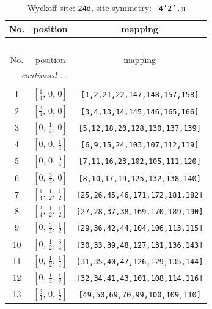 \documentclass[fleqn,8pt]{jsarticle}
\begin{document}
\begin{longtable}{ccc}
\caption{Wyckoff site: {\tt 24d}, site symmetry: {\tt -4'2'.m}}
 \\
 \hline \hline
No. & position & mapping \\ \hline \endfirsthead

\multicolumn{2}{l}{\tablename\ \thetable{}} \\
 \hline \hline
No. & position & mapping \\ \hline \endhead

 \hline \hline
\multicolumn{2}{r}{\footnotesize\it continued ...} \\ \endfoot

 \hline \hline
\multicolumn{2}{r}{} \\ \endlastfoot

1 & $\left[ \frac{1}{4},\, 0,\, 0 \right]$ & {\tt [1,2,21,22,147,148,157,158]} \\ \hline
2 & $\left[ \frac{3}{4},\, 0,\, 0 \right]$ & {\tt [3,4,13,14,145,146,165,166]} \\ \hline
3 & $\left[ 0,\, \frac{1}{4},\, 0 \right]$ & {\tt [5,12,18,20,128,130,137,139]} \\ \hline
4 & $\left[ 0,\, 0,\, \frac{1}{4} \right]$ & {\tt [6,9,15,24,103,107,112,119]} \\ \hline
5 & $\left[ 0,\, 0,\, \frac{3}{4} \right]$ & {\tt [7,11,16,23,102,105,111,120]} \\ \hline
6 & $\left[ 0,\, \frac{3}{4},\, 0 \right]$ & {\tt [8,10,17,19,125,132,138,140]} \\ \hline
7 & $\left[ \frac{1}{4},\, \frac{1}{2},\, \frac{1}{2} \right]$ & {\tt [25,26,45,46,171,172,181,182]} \\ \hline
8 & $\left[ \frac{3}{4},\, \frac{1}{2},\, \frac{1}{2} \right]$ & {\tt [27,28,37,38,169,170,189,190]} \\ \hline
9 & $\left[ 0,\, \frac{3}{4},\, \frac{1}{2} \right]$ & {\tt [29,36,42,44,104,106,113,115]} \\ \hline
10 & $\left[ 0,\, \frac{1}{2},\, \frac{3}{4} \right]$ & {\tt [30,33,39,48,127,131,136,143]} \\ \hline
11 & $\left[ 0,\, \frac{1}{2},\, \frac{1}{4} \right]$ & {\tt [31,35,40,47,126,129,135,144]} \\ \hline
12 & $\left[ 0,\, \frac{1}{4},\, \frac{1}{2} \right]$ & {\tt [32,34,41,43,101,108,114,116]} \\ \hline
13 & $\left[ \frac{3}{4},\, 0,\, \frac{1}{2} \right]$ & {\tt [49,50,69,70,99,100,109,110]} \\ \hline

\end{longtable}
\end{document}
